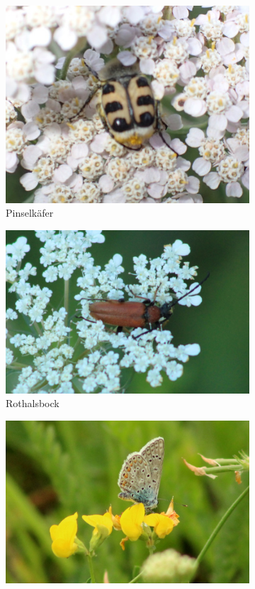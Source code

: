 \documentclass[10pt]{article}
\begin{document}
\begin{figure}[h!]
  \centering
  \begin{subfigure}[b]{0.41\linewidth}
    \includegraphics[width=\linewidth]{img/pinselkaefer.jpg}
    \caption{Pinselkäfer}
  \end{subfigure}
  \begin{subfigure}[b]{0.50\linewidth}
    \includegraphics[width=\linewidth]{img/schmalbock.jpg}
    \caption{Rothalsbock}
  \end{subfigure}
  \begin{subfigure}[b]{0.48\linewidth}
    \includegraphics[width=\linewidth]{img/blaeuling.jpg}

\end{subfigure}
\end{figure}
\end{document}
